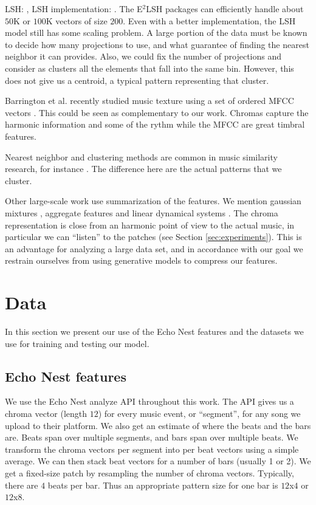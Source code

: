 \documentclass{article}
\begin{document}
LSH: \cite{Datar2004}, LSH implementation: \cite{E2LSH}.
The E$^2$LSH packages can efficiently handle about $50$K or $100$K
vectors of size $200$. Even with a better implementation, the LSH
model still has some scaling problem. A large portion of the data
must be known to decide how many projections to use, and what guarantee
of finding the nearest neighbor it can provides. Also, we could fix the
number of projections and consider as clusters all the elements that
fall into the same bin. However, this does not give us a centroid, a
typical pattern representing that cluster.

Barrington et al. recently studied music texture using a set of ordered
MFCC vectors \cite{Barrington2009a}. This could be seen as complementary
to our work. Chromas capture the harmonic information and some of the
rythm while the MFCC are great timbral features.

Nearest neighbor and clustering methods are common in music similarity 
research, for instance \cite{Cano2004,Holzapfel2009}. The difference here 
are the actual patterns that we cluster.

Other large-scale work use summarization of the features. We mention 
gaussian mixtures \cite{Mandel2005}, aggregate features \cite{Bergstra2006a}
and linear dynamical systems \cite{Barrington2009a}. The chroma representation
is close from an harmonic point of view to the actual music, in particular
we can ``listen'' to the patches (see Section \ref{sec:experiments}).
This is an advantage for analyzing a large data set, and in accordance with our goal
we restrain ourselves from using generative models to compress our features.


\section{Data}\label{sec:data}
In this section we present our use of the Echo Nest features and the
datasets we use for training and testing our model.


\subsection{Echo Nest features}
We use the Echo Nest analyze API \cite{EchoNest} throughout this work.
The API gives us a chroma vector (length $12$) for every music event, 
or ``segment'', for any song we upload to their platform. 
We also get an estimate of where the beats and the bars are. Beats span over
multiple segments, and bars span over multiple beats. 
We transform the chroma vectors per segment into per beat vectors using a 
simple average. We can then stack beat vectors for a number of bars 
(usually 1 or 2). 
We get a fixed-size patch by resampling the number of chroma vectors. Typically,
there are $4$ beats per bar. Thus an appropriate pattern size for one bar
is $12$x$4$ or $12$x$8$.
\end{document}
